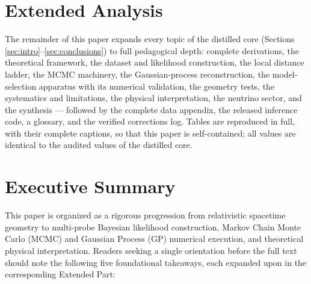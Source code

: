 \documentclass[aps,prd,preprint,superscriptaddress,nofootinbib]{revtex4-2}
\begin{document}
\clearpage
\section*{Extended Analysis}
The remainder of this paper expands every topic of the distilled core (Sections \ref{sec:intro}--\ref{sec:conclusions}) to full pedagogical depth: complete derivations, the theoretical framework, the dataset and likelihood construction, the local distance ladder, the MCMC machinery, the Gaussian-process reconstruction, the model-selection apparatus with its numerical validation, the geometry tests, the systematics and limitations, the physical interpretation, the neutrino sector, and the synthesis --- followed by the complete data appendix, the released inference code, a glossary, and the verified corrections log. Tables are reproduced in full, with their complete captions, so that this paper is self-contained; all values are identical to the audited values of the distilled core.

\section*{Executive Summary}

This paper is organized as a rigorous progression from relativistic spacetime geometry to multi-probe Bayesian likelihood construction, Markov Chain Monte Carlo (MCMC) and Gaussian Process (GP) numerical execution, and theoretical physical interpretation. Readers seeking a single orientation before the full text should note the following five foundational takeaways, each expanded upon in the corresponding Extended Part:
\end{document}
